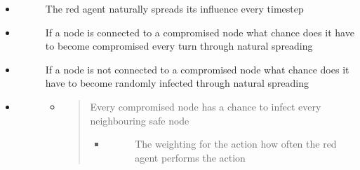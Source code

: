 \documentclass[letterpaper,10pt,english]{sphinxmanual}
\begin{document}
\begin{itemize}
\begin{description}
\end{description}

\item {} \begin{description}
\item[{}] \leavevmode
\sphinxAtStartPar
The red agent naturally spreads its influence every time\sphinxhyphen{}step

\end{description}

\item {} \begin{description}
\item[{}] \leavevmode
\sphinxAtStartPar
If a node is connected to a compromised node what chance does it have to become compromised every turn through natural spreading

\end{description}

\item {} \begin{description}
\item[{}] \leavevmode
\sphinxAtStartPar
If a node is not connected to a compromised node what chance does it have to become randomly infected through natural spreading

\end{description}

\item {} \begin{description}
\item[{}] \leavevmode\begin{itemize}
\item {}
\sphinxAtStartPar
{}
\begin{quote}

\sphinxAtStartPar
Every compromised node has a chance to infect every neighbouring safe node
\begin{itemize}
\item {} \begin{description}
\item[{}] \leavevmode
\sphinxAtStartPar
The weighting for the action \sphinxhyphen{} how often the red agent performs the action

\end{description}


\end{itemize}
\end{quote}
\end{itemize}
\end{description}
\end{itemize}
\end{document}
